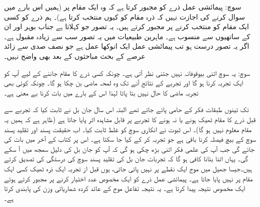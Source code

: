 \quad {}
 سوچ:  پیمائشی عمل ذرے کو مجبور کرتا ہے کہ وہ ایک مقام پر  (ہمیں اس بارے میں سوال کرنے کی اجازت نہیں کہ ذرہ مقام  کو کیوں منتخب کرتا ہے)۔  ہم ذرے کو کسی ایک مقام کو منتخب کرنے پر مجبور کرتے ہیں۔ یہ تصور جو  کہلاتا ہے جناب بوہر اور ان کے ساتھیوں سے منسوب ہے۔ ماہرین طبیعیات میں یہ تصور سب سے زیادہ مقبول ہے۔اگر یہ تصور درست ہو تب پیمائشی عمل ایک انوکھا عمل ہے جو نصف صدی سے زائد عرصے کے بحث مباحثوں کے بعد بھی واضح نہیں۔

\quad {}
 سوچ:  یہ سوچ اتنی بیوقوفانہ نہیں جتنی نظر آتی ہے۔ چونکہ کسی ذرے کا مقام جاننے کے لیے آپ کو ایک تجربہ کرنا ہو گا اور تجربے کے نتائج آنے تک وہ لمحہ ماضی بن چکا ہو گا۔ چونکہ کوئی بھی تجربہ ماضی کا حال نہیں بتا پاتا لہٰذا اس کے بارے میں بات کرنا بے معنی ہے۔ 

  تک تینوں طبقات فکر کے حامی پائے جاتے تھے البتہ اس سال جان بل نے ثابت کیا کہ تجربے سے قبل ذرے کا مقام ٹھیک ہونے یا نہ ہونے کا تجربے پر قابل مشاہدہ اثر پایا جاتا ہے (ظاہر ہے کہ ہمیں یہ مقام معلوم نہیں ہو گا)۔ اس ثبوت نے انکاری سوچ کو غلط ثابت کیا۔ اب حقیقت پسند اور تقلید پسند سوچ کے بیچ فیصلہ کرنا باقی ہے جو تجربہ کر کے کیا جا سکتا ہے۔ اس پر کتاب کے آخر میں بات کی جائے گی جب آپ کی علمی فکر اتنی بڑھ چکی ہو گی کہ آپ کو جان بل کی دلیل سمجھ میں آ سکے گی۔ یہاں اتنا بتانا کافی ہو گا کہ تجربات جان بل کی تقلید پسند سوچ کی درستگی کی تصدیق کرتے ہیں۔جیسا جھیل میں موج ایک نقطے پر نہیں پائی جاتی، یوں قبل از تجربہ ایک ذرہ ٹھیک کسی ایک مقام پر نہیں پایا جاتا ہے۔ پیمائشی عمل ذرے کو ایک مخصوص عدد اختیار کرنے پر مجبور کرتے ہوئے ایک مخصوص نتیجہ پیدا کرتا ہے۔ یہ نتیجہ تفاعل موج کے عائد کردہ شماریاتی وزن کی پابندی کرتا ہے۔

